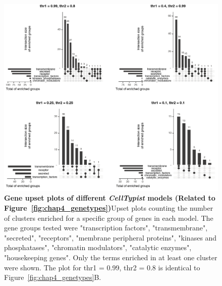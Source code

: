 \begin{figure}[ht!] 
\centering
\includegraphics[scale=0.79]{Appendix3/Figs/appB_upset.png} %
\caption[Gene upset plots of different \textit{CellTypist} models]{\textbf{Gene upset plots of different \textit{CellTypist} models (Related to Figure~\ref{fig:chap4_genetypes})}\newline Upset plots counting the number of clusters enriched for a specific group of genes in each model. The gene groups tested were "transcription factors", "transmembrane", "secreted", "receptors", "membrane peripheral proteins", "kinases and phosphatases", "chromatin modulators", "catalytic enzymes", "housekeeping genes". Only the terms enriched in at least one cluster were shown. The plot for thr1 = 0.99, thr2 = 0.8 is identical to Figure~\ref{fig:chap4_genetypes}B.}
\label{fig:appB_supupset}
\end{figure}


